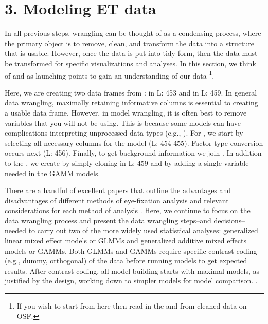 \section{3. Modeling ET data}

In all previous steps, wrangling can be thought of as a condensing process, where the primary object is to remove, clean, and transform the data into a structure that is usable. However, once the data is put into tidy form, then the data must be transformed for specific visualizations and analyses. In this section, we think of  and  as launching points to gain an understanding of our data \footnote{If you wish to start from here then read in the  and  from cleaned data on OSF.}.

 Here, we are creating two data frames from :  in L: 453 and  in L: 459. In general data wrangling, maximally retaining informative columns is essential to creating a usable data frame. However, in model wrangling, it is often best to remove variables that you will not be using. This is because some models can have complications interpreting unprocessed data types (e.g., ). For , we start by selecting all necessary columns for the model (L: 454-455). Factor type conversion occurs next (L: 456). Finally, to get background information we join . In addition to the , we create  by simply cloning  in L: 459 and by adding a single variable needed in the GAMM models.



There are a handful of excellent papers that outline the advantages and disadvantages of different methods of eye-fixation analysis and relevant considerations for each method of analysis \parencite{Ito_Knoeferle_2022,Mirman_Dixon_Magnuson_2008,McMurray_2023,Barr_2008}. Here, we continue to focus on the data wrangling process and present the data wrangling steps--and decisions--needed to carry out two of the more widely used statistical analyses: generalized linear mixed effect models or GLMMs and generalized additive mixed effects models or GAMMs. Both GLMMs and GAMMs require specific contrast coding (e.g., dummy, orthogonal) of the data before running models to get expected results.  After contrast coding, all model building starts with maximal models, as justified by the design, working down to simpler models for model comparison. \parencite{Barr_Levy_Scheepers_Tily_2013}.

